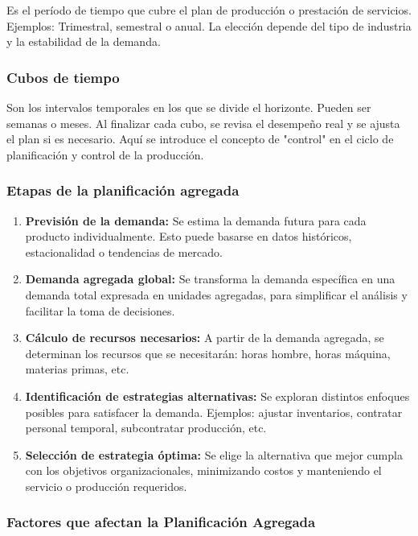 \documentclass[a4paper,oneside,11pt]{article}
\begin{document}
Es el período de tiempo que cubre el plan de producción o prestación de servicios.
Ejemplos: Trimestral, semestral o anual.
La elección depende del tipo de industria y la estabilidad de la demanda.

\subsubsection{Cubos de tiempo}

Son los intervalos temporales en los que se divide el horizonte. Pueden ser semanas o meses. Al finalizar cada cubo, se revisa el desempeño real y se ajusta el plan si es necesario. Aquí se introduce el concepto de "control" en el ciclo de planificación y control de la producción.

\subsubsection{Etapas de la planificación agregada}

\begin{enumerate}
    \item \textbf{Previsión de la demanda:} Se estima la demanda futura para cada producto individualmente. Esto puede basarse en datos históricos, estacionalidad o tendencias de mercado.
    \item \textbf{Demanda agregada global:} Se transforma la demanda específica en una demanda total expresada en unidades agregadas, para simplificar el análisis y facilitar la toma de decisiones.
    \item \textbf{Cálculo de recursos necesarios:} A partir de la demanda agregada, se determinan los recursos que se necesitarán: horas hombre, horas máquina, materias primas, etc.
    \item \textbf{Identificación de estrategias alternativas:} Se exploran distintos enfoques posibles para satisfacer la demanda. Ejemplos: ajustar inventarios, contratar personal temporal, subcontratar producción, etc.
    \item \textbf{Selección de estrategia óptima:} Se elige la alternativa que mejor cumpla con los objetivos organizacionales, minimizando costos y manteniendo el servicio o producción requeridos.
\end{enumerate}

\subsubsection{Factores que afectan la Planificación Agregada}
\end{document}
